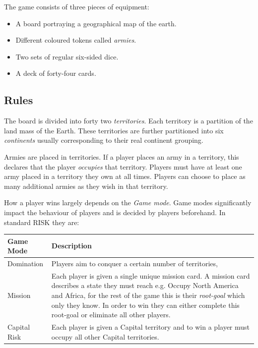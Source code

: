 \documentclass[parskip]{cs4rep}
\begin{document}
The game consists of three pieces of equipment:

\begin{itemize}
\item
A board portraying a geographical map of the earth.
\item
Different coloured tokens called \textit{armies}.
\item
Two sets of regular six-sided dice.
\item
A deck of forty-four cards.
\end{itemize}

\subsection{Rules}

The board is divided into forty two \textit{territories}. Each territory is a partition of the land mass of the Earth. These territories are further partitioned into six \textit{continents} usually corresponding to their real continent grouping.

Armies are placed in territories. If a player places an army in a territory, this declares that the player \textit{occupies} that territory. Players must have at least one army placed in a territory they own at all times. Players can choose to place as many additional armies as they wish in that territory.

How a player wins largely depends on the \textit{Game mode}. Game modes significantly impact the behaviour of players and is decided by players beforehand. In standard RISK they are:
\newline

\begin{tabular}{|l|p{11cm}|}
\hline 
\textbf{Game Mode} & \textbf{Description} \\ 
\hline 
Domination & Players aim to conquer a certain number of territories, \\ 
\hline 
Mission & Each player is given a single unique mission card. A mission card describes a state they must reach e.g. Occupy North America and Africa, for the rest of the game this is their \textit{root-goal} which only they know. In order to win they can either complete this root-goal or eliminate all other players. \\ 
\hline 
Capital Risk & Each player is given a Capital territory and to win a player must occupy all other Capital territories. \\ 
\hline
\end{tabular} 
\newline
\end{document}
